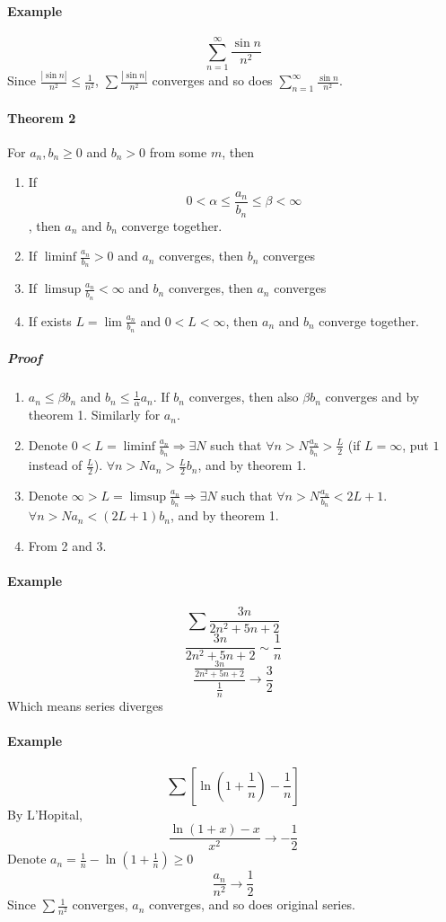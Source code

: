 \paragraph{Example} $$\sum_{n=1}^{\infty} \frac{\sin n}{n^2}$$
Since $\frac{\left|\sin n\right|}{n^2} \leq \frac{1}{n^2}$, $\sum \frac{\left|\sin n\right|}{n^2}$ converges and so does  $\sum_{n=1}^{\infty} \frac{\sin n}{n^2}$.
\paragraph{Theorem 2} For $a_n, b_n \geq 0$ and $b_n>0$ from some $m$, then 
\begin{enumerate}
	\item If $$0 < \alpha \leq \frac{a_n}{b_n} \leq \beta < \infty$$, then $a_n$ and $b_n$ converge together.
	\item If $\liminf \frac{a_n}{b_n} > 0$ and $a_n$ converges, then $b_n$ converges
	\item If $\limsup \frac{a_n}{b_n} < \infty$ and $b_n$ converges, then $a_n$ converges
	\item If exists $L = \lim \frac{a_n}{b_n}$ and $0< L < \infty$, then $a_n$ and $b_n$ converge together.
\end{enumerate}
\subparagraph{Proof}
\begin{enumerate}
	\item $a_n \leq \beta b_n$ and $b_n \leq \frac{1}{\alpha} a_n$. If $b_n$ converges, then also $\beta b_n$ converges and by theorem 1. Similarly for $a_n$.
	\item Denote $0 < L = \liminf \frac{a_n}{b_n} \Rightarrow \exists N$ such that $\forall n>N \frac{a_n}{b_n} > \frac{L}{2}$ (if $L=\infty$, put $1$ instead of $\frac{L}{2}$). $\forall n>N a_n >  \frac{L}{2}b_n$, and by theorem 1.
	\item   Denote $\infty > L = \limsup \frac{a_n}{b_n} \Rightarrow \exists N$ such that $\forall n>N \frac{a_n}{b_n} < 2L+1$. $\forall n>N a_n <  \left( 2L+1 \right)b_n$, and by theorem 1.
	\item From 2 and 3.
\end{enumerate}
\paragraph{Example} $$\sum \frac{3n}{2n^2+5n+2}$$
$$\frac{3n}{2n^2+5n+2} \sim \frac{1}{n} $$
$$\frac{\frac{3n}{2n^2+5n+2}}{\frac{1}{n}} \to \frac{3}{2}$$
Which means series diverges
\paragraph{Example} $$\sum \left[ \ln \left( 1 + \frac{1}{n} \right) - \frac{1}{n} \right]$$
By L'Hopital, $$\frac{\ln \left( 1+x \right)-x}{x^2} \to -\frac{1}{2}$$
Denote $a_n = \frac{1}{n} - \ln \left( 1 + \frac{1}{n} \right) \geq 0$
$$\frac{a_n}{n^2} \to \frac{1}{2}$$
Since $\sum \frac{1}{n^2}$ converges, $a_n$ converges, and so does original series.

